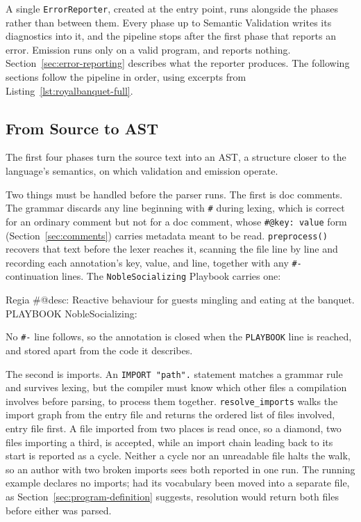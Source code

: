 A single \lstinline|ErrorReporter|, created at the entry point, runs alongside the phases rather than between them. Every phase up to Semantic Validation writes its diagnostics into it, and the pipeline stops after the first phase that reports an error. Emission runs only on a valid program, and reports nothing. Section~\ref{sec:error-reporting} describes what the reporter produces. The following sections follow the pipeline in order, using excerpts from Listing~\ref{lst:royalbanquet-full}.
 
 
\subsection{From Source to AST}
\label{sec:source-to-ast}
\label{sec:preprocessing}
\label{sec:comment-attachment}
 
The first four phases turn the source text into an AST, a structure closer to the language's semantics, on which validation and emission operate.
 
Two things must be handled before the parser runs. The first is doc comments. The grammar discards any line beginning with \lstinline|#| during lexing, which is correct for an ordinary comment but not for a doc comment, whose \lstinline|#@key: value| form (Section~\ref{sec:comments}) carries metadata meant to be read. \lstinline|preprocess()| recovers that text before the lexer reaches it, scanning the file line by line and recording each annotation's key, value, and line, together with any \lstinline|#-| continuation lines. The \lstinline|NobleSocializing| Playbook carries one:
 
\begin{codeblock}[]{Regia}
#@desc: Reactive behaviour for guests mingling and eating at the banquet.
PLAYBOOK NobleSocializing:
\end{codeblock}
 
No \lstinline|#-| line follows, so the annotation is closed when the \lstinline|PLAYBOOK| line is reached, and stored apart from the code it describes.
 
The second is imports. An \lstinline|IMPORT "path".| statement matches a grammar rule and survives lexing, but the compiler must know which other files a compilation involves before parsing, to process them together. \lstinline|resolve_imports| walks the import graph from the entry file and returns the ordered list of files involved, entry file first. A file imported from two places is read once, so a diamond, two files importing a third, is accepted, while an import chain leading back to its start is reported as a cycle. Neither a cycle nor an unreadable file halts the walk, so an author with two broken imports sees both reported in one run. The running example declares no imports; had its vocabulary been moved into a separate file, as Section~\ref{sec:program-definition} suggests, resolution would return both files before either was parsed.
 

